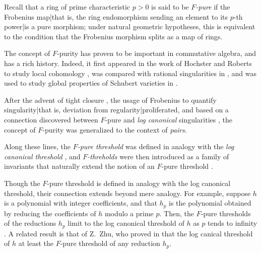 \documentclass{amsart}
\begin{document}
Recall that a ring of prime characteristic $p>0$ is said to be \emph{$F$-pure} if the Frobenius map|that is, the ring endomorphism sending an element to its $p$-th power|is a pure morphism;  under natural geometric hypotheses, this is equivalent to the condition that the Frobenius morphism splits as a map of rings.

The concept of $F$-purity has proven to be important in commutative algebra, and has a rich history.  Indeed, it first appeared in the work \cite{HochsterRobertsFrobeniusLocalCohomology}  of Hochster and Roberts to study local cohomology \cite{HochsterRobertsFrobeniusLocalCohomology}, was compared with rational singularities in  \cite{FedderFPureRat}, and was used to study global properties of Schubert varieties in \cite{MehtaRamanathanFrobeniusSplittingAndCohomologyVanishing}.

After the advent of tight closure \cite{HochsterHunekeTC1}, the usage of Frobenius to quantify singularity|that is, deviation from regularity|proliferated, and based on a connection discovered between $F$-pure and \emph{log canonical} singularities \cite{HaraWatanabeFRegFPure}, the concept of $F$-purity was generalized to the context of \emph{pairs}.

Along these lines, the \emph{$F$-pure threshold} %
was defined in analogy with the \emph{log canonical threshold} \cite{TakagiWatanabeFPureThresh}, and
\emph{$F$-threholds} were then introduced as a family of invariants that naturally extend the notion of an $F$-pure threshold \cite{MustataTakagiWatanabeFThresholdsAndBernsteinSato}.

Though the $F$-pure threshold is defined in analogy with the log canonical threshold, their connection extends beyond mere analogy. For example, suppose $h$ is a polynomial with integer coefficients, and that $h_p$ is the polynomial obtained by reducing the coefficients of $h$ modulo a prime $p$.  Then, the $F$-pure thresholds of the reductions $h_p$ limit to the log canonical threshold of $h$ as $p$ tends to infinity \cite{HaraYoshidaGeneralizationOfTightClosure}.    A related result is that of Z.~Zhu, who proved in  \cite[Corollary 4.2]{ZhuLogCanoincalThresholdsInPositiveChar} that the log canical threshold of $h$ at least the $F$-pure threshold of any reduction $h_p$.
\end{document}
